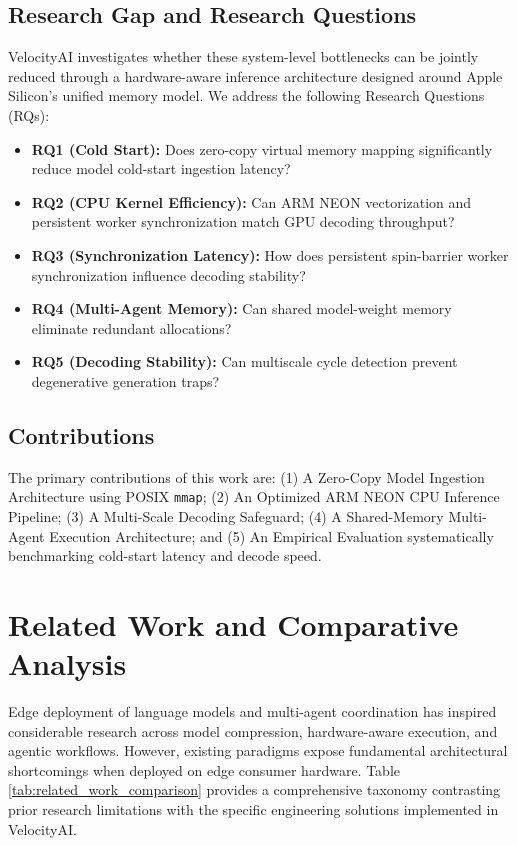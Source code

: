 \documentclass[a4paper,twocolumn,10pt]{article}
\begin{document}
\subsection{Research Gap and Research Questions}
VelocityAI investigates whether these system-level bottlenecks can be jointly reduced through a hardware-aware inference architecture designed around Apple Silicon's unified memory model. We address the following Research Questions (RQs):
\begin{itemize}
    \item \textbf{RQ1 (Cold Start):} Does zero-copy virtual memory mapping significantly reduce model cold-start ingestion latency?
    \item \textbf{RQ2 (CPU Kernel Efficiency):} Can ARM NEON vectorization and persistent worker synchronization match GPU decoding throughput?
    \item \textbf{RQ3 (Synchronization Latency):} How does persistent spin-barrier worker synchronization influence decoding stability?
    \item \textbf{RQ4 (Multi-Agent Memory):} Can shared model-weight memory eliminate redundant allocations?
    \item \textbf{RQ5 (Decoding Stability):} Can multiscale cycle detection prevent degenerative generation traps?
\end{itemize}

\subsection{Contributions}
The primary contributions of this work are: (1) A Zero-Copy Model Ingestion Architecture using POSIX \texttt{mmap}; (2) An Optimized ARM NEON CPU Inference Pipeline; (3) A Multi-Scale Decoding Safeguard; (4) A Shared-Memory Multi-Agent Execution Architecture; and (5) An Empirical Evaluation systematically benchmarking cold-start latency and decode speed.

\section{Related Work and Comparative Analysis}

Edge deployment of language models and multi-agent coordination has inspired considerable research across model compression, hardware-aware execution, and agentic workflows. However, existing paradigms expose fundamental architectural shortcomings when deployed on edge consumer hardware. Table \ref{tab:related_work_comparison} provides a comprehensive taxonomy contrasting prior research limitations with the specific engineering solutions implemented in VelocityAI.
\end{document}
